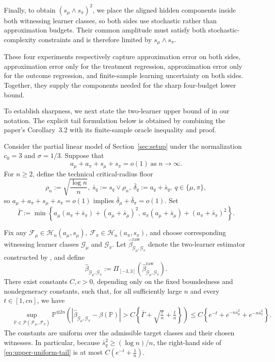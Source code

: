 \documentclass[11pt]{article}
\begin{document}
Finally, to obtain $(s_\mu\wedge s_\pi)^2$,
we place the aligned hidden components inside both witnessing learner classes,
so both sides use stochastic rather than approximation budgets.  Their common
amplitude must satisfy both stochastic-complexity constraints and is therefore
limited by \(s_\mu\wedge s_\pi\).

These four experiments respectively capture approximation error on both
sides, approximation error only for the treatment regression, approximation
error only for the outcome regression, and finite-sample learning uncertainty
on both sides.  Together, they supply the components needed for the sharp
four-budget lower bound.






To establish sharpness, we next state the two-learner upper bound of
\citet{gu2026optimal} in our notation.  The explicit tail formulation below
is obtained by combining the paper's Corollary~3.2 with its finite-sample
oracle inequality and proof.

\begin{theorem}
\label{thm:upper_bound}
Consider the partial linear model of Section~\ref{sec:setup} under the
normalization \(c_0=3\) and \(\sigma=1/3\).  Suppose that
\[
a_\mu+a_\pi+s_\mu+s_\pi=o(1)
\ \text{as }n\to\infty.
\]
For \(n\geq2\), define the technical critical-radius floor
\[
\rho_n
:=
\sqrt{\frac{\log n}{n}},
\ 
\bar s_q
:=
s_q\vee\rho_n,
\ 
\bar\delta_q
:=
a_q+\bar s_q,
\ q\in\{\mu,\pi\},
\]
so $a_\mu+a_\pi+s_\mu+s_\pi=o(1)$ implies
\(\bar\delta_\mu+\bar\delta_\pi=o(1)\).  Set
\[
\bar\Gamma
:=
\min\left\{
a_\mu(a_\pi+\bar s_\pi)+(a_\mu+\bar s_\mu)^2,\,
a_\pi(a_\mu+\bar s_\mu)+(a_\pi+\bar s_\pi)^2
\right\}.
\]

Fix any $\mathcal F_\mu\in\mathcal H_n(a_\mu,s_\mu),
\ 
\mathcal F_\pi\in\mathcal H_n(a_\pi,s_\pi)$, and choose corresponding witnessing learner classes
\(\mathcal G_\mu\) and \(\mathcal G_\pi\).  Let
\(\widehat\beta^{\mathrm{raw}}_{\mathcal G_\mu,\mathcal G_\pi}\)
denote the two-learner estimator constructed by
\citet{gu2026optimal}, and define
\[
\widehat\beta_{\mathcal G_\mu,\mathcal G_\pi}
:=
\Pi_{[-3,3]}
\left(
\widehat\beta^{\mathrm{raw}}_{\mathcal G_\mu,\mathcal G_\pi}
\right).
\]
There exist constants \(C,c>0\), depending only on the fixed boundedness
and nondegeneracy constants, such that, for all sufficiently large \(n\)
and every \(t\in[1,cn]\), we have
\begin{align}
&\sup_{\mathbb P\in
\mathcal P(\mathcal F_\mu,\mathcal F_\pi)}
\mathbb P^{\otimes2n}
\left(
\left|
\widehat\beta_{\mathcal G_\mu,\mathcal G_\pi}
-\beta(\mathbb P)
\right|
>
C\left\{
\bar\Gamma
+\sqrt{\frac tn}
+\frac tn
\right\}
\right)\leq
C\left\{
e^{-t}
+e^{-n\bar s_\mu^2}
+e^{-n\bar s_\pi^2}
\right\}.
\label{eq:upper-uniform-tail}
\end{align}
The constants are uniform over the admissible target classes and their
chosen witnesses.  In particular, because
\(\bar s_q^2\geq(\log n)/n\), the right-hand side of
\eqref{eq:upper-uniform-tail} is at most $C\left(e^{-t}+\frac1n\right)$.

\end{theorem}
\end{document}

